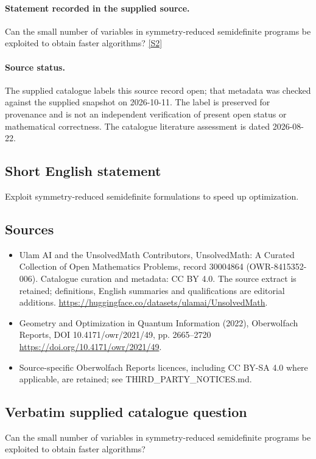 \documentclass[11pt]{article}
\begin{document}
\paragraph{Statement recorded in the supplied source.}
Can the small number of variables in symmetry-reduced semidefinite programs be exploited to obtain faster algorithms? \href{https://doi.org/10.4171/owr/2021/49}{[S2]}
\paragraph{Source status.}
The supplied catalogue labels this source record open; that metadata was checked against the supplied snapshot on 2026-10-11. The label is preserved for provenance and is not an independent verification of present open status or mathematical correctness. The catalogue literature assessment is dated 2026-08-22.
\subsection{Short English statement}
Exploit symmetry-reduced semidefinite formulations to speed up optimization.
\subsection{Sources}
\begin{itemize}
\item[S1] Ulam AI and the UnsolvedMath Contributors, UnsolvedMath: A Curated Collection of Open Mathematics Problems, record 30004864 (OWR-8415352-006). Catalogue curation and metadata: CC BY 4.0. The source extract is retained; definitions, English summaries and qualifications are editorial additions.
\url{https://huggingface.co/datasets/ulamai/UnsolvedMath}.
\item[S2] Geometry and Optimization in Quantum Information (2022), Oberwolfach Reports, DOI 10.4171/owr/2021/49, pp. 2665--2720
\url{https://doi.org/10.4171/owr/2021/49}.
\item Source-specific Oberwolfach Reports licences, including CC BY-SA 4.0 where applicable, are retained; see THIRD\_PARTY\_NOTICES.md.
\end{itemize}
\subsection{Verbatim supplied catalogue question}
Can the small number of variables in symmetry-reduced semidefinite programs be exploited to obtain faster algorithms?
\end{document}
